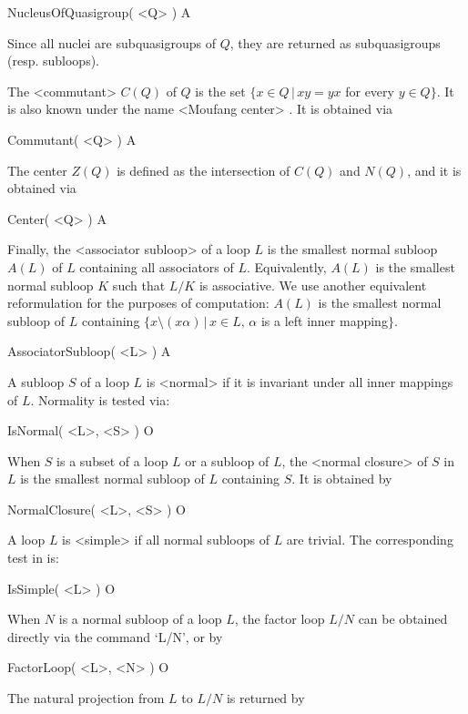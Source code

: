 \>NucleusOfQuasigroup( <Q> ) A

Since all nuclei are subquasigroups of $Q$, they are returned as subquasigroups
(resp. subloops).

The <commutant>
%
%
 $C(Q)$ of $Q$ is the set $\{x\in Q\,|\,xy=yx$
for every $y\in Q\}$. It is also known under the name <Moufang center>
%
%
.
It is obtained via

\>Commutant( <Q> ) A

The center $Z(Q)$ is defined as the intersection of $C(Q)$ and $N(Q)$, and it
is obtained via

\>Center( <Q> ) A

Finally, the <associator subloop>
%
%
of a loop $L$ is the smallest normal subloop $A(L)$ of $L$
containing all associators of $L$. Equivalently, $A(L)$ is the
smallest normal subloop $K$ such that $L/K$ is associative. We use
another equivalent reformulation for the purposes of computation:
$A(L)$ is the smallest normal subloop of $L$ containing
$\{x\setminus(x\alpha)\,|\,x\in L,\,\alpha$ is a left inner
mapping$\}$.

\>AssociatorSubloop( <L> )  A


A subloop $S$ of a loop $L$ is <normal> if it is
invariant under all inner mappings of $L$. Normality is tested via:

\>IsNormal( <L>, <S> ) O

When $S$ is a subset of a loop $L$ or a subloop of $L$, the <normal closure>
%
%
 of $S$ in $L$ is the smallest normal subloop of $L$ containing $S$. It
is obtained by

\>NormalClosure( <L>, <S> ) O

A loop $L$ is <simple> if all normal subloops of $L$ are
trivial. The corresponding test in {\LOOPS} is:

\>IsSimple( <L> ) O


When $N$ is a normal subloop of a loop $L$, the factor loop $L/N$ can be
obtained directly via the command `L/N', or by

\>FactorLoop( <L>, <N> ) O

The natural projection from $L$ to $L/N$ is returned by

